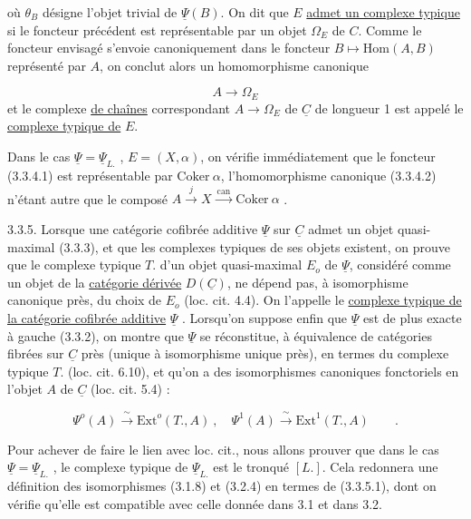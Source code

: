  où $\theta_B$ désigne l'objet trivial de $\underline{\Psi}(B)$. On dit que $E$ \underline{admet un complexe typique} si le foncteur précédent est représentable par un objet $\Omega_E$ de $C$. Comme le foncteur envisagé s'envoie canoniquement dans le foncteur $B \longmapsto \mathrm{Hom}(A,B)$ représenté par $A$, on conclut alors un homomorphisme canonique

\begin{equation}\tag{3.3.4.2}
A \longrightarrow \Omega_E
\end{equation}
et le complexe \underline{de chaînes} correspondant $A \longrightarrow \Omega_E$ de $\underline{C}$ de longueur 1 est appelé le \underline{complexe typique de} $E$.

Dans le cas $\underline{\Psi} = \underline{\Psi}_{L.}$ , $E = (X,\alpha)$, on vérifie immédiatement que le foncteur (3.3.4.1) est représentable par $\mathrm{Coker}\ \alpha$, l'homomorphisme canonique (3.3.4.2) n'étant autre que le composé $A \xrightarrow{\ j\ } X \xrightarrow{\ \mathrm{can}\ } \mathrm{Coker}\ \alpha$ .

3.3.5. Lorsque une catégorie cofibrée additive $\underline{\Psi}$ sur $\underline{C}$ admet un objet quasi-maximal (3.3.3), et que les complexes typiques de ses objets existent, on prouve que le complexe typique $T.$ d'un objet quasi-maximal $E_o$ de $\underline{\Psi}$, considéré comme un objet de la \underline{catégorie dérivée} $D(\underline{C})$, ne dépend pas, à isomorphisme canonique près, du choix de $E_o$ (loc. cit. 4.4). On l'appelle le \underline{complexe typique de la catégorie cofibrée additive} $\underline{\Psi}$ . Lorsqu'on suppose enfin que $\underline{\Psi}$ est de plus exacte à gauche (3.3.2), on montre que $\underline{\Psi}$ se réconstitue, à équivalence de catégories fibrées sur $\underline{C}$ près (unique à isomorphisme unique près), en termes du complexe typique $T.$ (loc. cit. 6.10), et qu'on a des isomorphismes canoniques fonctoriels en l'objet $A$ de $\underline{C}$ (loc. cit. 5.4) :

\begin{equation}\tag{3.3.5.1}
\Psi^o(A) \xrightarrow{\ \sim\ } \mathrm{Ext}^o(T.,A) \ , \quad \Psi^1(A) \xrightarrow{\ \sim\ } \mathrm{Ext}^1(T.,A) \qquad .
\end{equation}


Pour achever de faire le lien avec loc. cit., nous allons prouver que dans le cas $\underline{\Psi} = \underline{\Psi}_{L.}$ , le complexe typique de $\underline{\Psi}_{L.}$ est le tronqué $[L.]$. Cela redonnera une définition des isomorphismes (3.1.8) et (3.2.4) en termes de (3.3.5.1), dont on vérifie qu'elle est compatible avec celle donnée dans 3.1 et dans 3.2.

